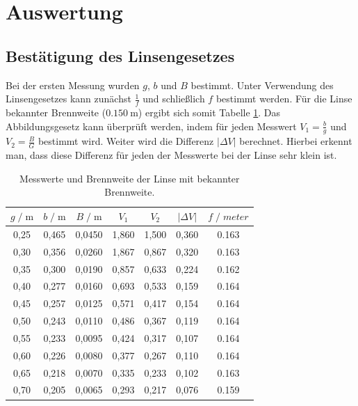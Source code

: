 \section{Auswertung}
\label{sec:Auswertung}

\subsection{Bestätigung des Linsengesetzes}

Bei der ersten Messung wurden $g$, $b$ und $B$ bestimmt. Unter Verwendung des Linsengesetzes 
kann zunächst $\frac{1}{f}$ und schließlich $f$ bestimmt werden. Für die Linse bekannter
Brennweite ($\SI{0.150}{\meter}$) ergibt sich somit Tabelle \ref{tab:mess1}. Das Abbildungsgesetz 
kann überprüft werden, indem für jeden Messwert $V_1 = \frac{b}{g}$ und $V_2= \frac{B}{G}$
bestimmt wird. Weiter wird die Differenz $\vert\Delta V \vert$ berechnet. Hierbei erkennt 
man, dass diese Differenz für jeden der Messwerte bei der Linse sehr klein ist.\\

\begin{table}
    \centering
    \caption{Messwerte und Brennweite der Linse mit bekannter Brennweite.}
    \label{tab:mess1}
    \begin{tabular}{c c c c c c c}
    \toprule
    $ g \;/\; \si{\meter} $ & $b \;/\; \si{\meter}$ &
    $ B \;/\; \si{\meter} $ & $V_1$ & $V_2$ & $\vert \Delta V \vert$ & $f \;/\; \si{meter}$\\
    \midrule 
        0,25 & 0,465 & 0,0450 & 1,860 & 1,500 & 0,360 & 0.163\\
        0,30 & 0,356 & 0,0260 & 1,867 & 0,867 & 0,320 & 0.163\\
        0,35 & 0,300 & 0,0190 & 0,857 & 0,633 & 0,224 & 0.162\\
        0,40 & 0,277 & 0,0160 & 0,693 & 0,533 & 0,159 & 0.164\\
        0,45 & 0,257 & 0,0125 & 0,571 & 0,417 & 0,154 & 0.164\\
        0,50 & 0,243 & 0,0110 & 0,486 & 0,367 & 0,119 & 0.164\\
        0,55 & 0,233 & 0,0095 & 0,424 & 0,317 & 0,107 & 0.164\\
        0,60 & 0,226 & 0,0080 & 0,377 & 0,267 & 0,110 & 0.164\\
        0,65 & 0,218 & 0,0070 & 0,335 & 0,233 & 0,102 & 0.163\\
        0,70 & 0,205 & 0,0065 & 0,293 & 0,217 & 0,076 & 0.159\\          
    \bottomrule
    \end{tabular}
    \end{table}

